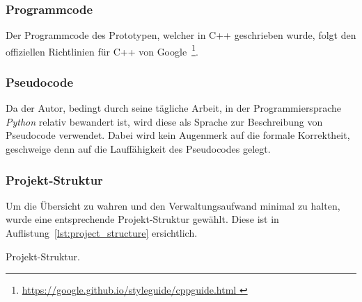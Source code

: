 \subsubsection{Programmcode}
\label{ssubsec:standards_guidelines:code}

Der Programmcode des Prototypen, welcher in C++ geschrieben wurde, folgt
den offiziellen Richtlinien für C++ von Google~\footnote{
    \href{https://google.github.io/styleguide/cppguide.html}{
        https://google.github.io/styleguide/cppguide.html
    }
}.

\subsubsection{Pseudocode}
\label{ssubsec:standards_guidelines:psuedocode}

Da der Autor, bedingt durch seine tägliche Arbeit, in der
Programmiersprache \textit{Python} relativ bewandert ist, wird diese als
Sprache zur Beschreibung von Pseudocode verwendet.  Dabei wird kein
Augenmerk auf die formale Korrektheit, geschweige denn auf die
Lauffähigkeit des Pseudocodes gelegt.

\subsubsection{Projekt-Struktur}
\label{ssubsec:standards_guidelines:project_structure}

Um die Übersicht zu wahren und den Verwaltungsaufwand minimal zu halten,
wurde eine entsprechende Projekt-Struktur gewählt. Diese ist in
Auflistung~\ref{lst:project_structure} ersichtlich.

\begin{listing}
	\caption{Projekt-Struktur.}\label{lst:project_structure}
\end{listing}
